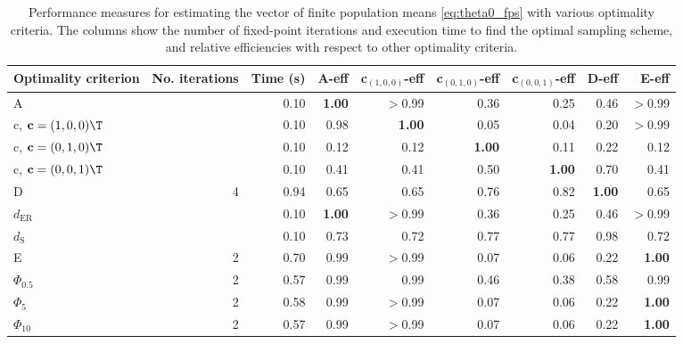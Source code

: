 \begin{table}[htb!]
\centering
\caption{Performance measures for estimating the vector of finite population means \eqref{eq:theta0_fps} with various optimality criteria. The columns show the number of fixed-point iterations and execution time to find the optimal sampling scheme, and relative efficiencies with respect to other optimality criteria.} 
\label{tab:finite_population_inference}
\begin{tabular}{lrrrrrrrr}
 Optimality criterion & No. iterations & Time (s) & A-eff & c$_{(1,0,0)}$-eff & c$_{(0,1,0)}$-eff & c$_{(0,0,1)}$-eff & D-eff & E-eff \\ 
  \hline
A &  & 0.10 & \textbf{1.00} & $>$0.99 & 0.36 & 0.25 & 0.46 & $>$0.99 \\ 
  c, $\mathbf{c} = (1,0,0)\T$ &  & 0.10 & 0.98 & \textbf{1.00} & 0.05 & 0.04 & 0.20 & $>$0.99 \\ 
  c, $\mathbf{c} = (0,1,0)\T$ &  & 0.10 & 0.12 & 0.12 & \textbf{1.00} & 0.11 & 0.22 & 0.12 \\ 
  c, $\mathbf{c} = (0,0,1)\T$ &  & 0.10 & 0.41 & 0.41 & 0.50 & \textbf{1.00} & 0.70 & 0.41 \\ 
  D & 4 & 0.94 & 0.65 & 0.65 & 0.76 & 0.82 & \textbf{1.00} & 0.65 \\ 
  $d_{\mathrm{ER}}$ &  & 0.10 & \textbf{1.00} & $>$0.99 & 0.36 & 0.25 & 0.46 & $>$0.99 \\ 
  $d_{\mathrm{S}}$ &  & 0.10 & 0.73 & 0.72 & 0.77 & 0.77 & 0.98 & 0.72 \\ 
  E & 2 & 0.70 & 0.99 & $>$0.99 & 0.07 & 0.06 & 0.22 & \textbf{1.00} \\ 
  $\Phi_{0.5}$ & 2 & 0.57 & 0.99 & 0.99 & 0.46 & 0.38 & 0.58 & 0.99 \\ 
  $\Phi_5$ & 2 & 0.58 & 0.99 & $>$0.99 & 0.07 & 0.06 & 0.22 & \textbf{1.00} \\ 
  $\Phi_{10}$ & 2 & 0.57 & 0.99 & $>$0.99 & 0.07 & 0.06 & 0.22 & \textbf{1.00} \\ 
   \hline
\end{tabular}
\end{table}
